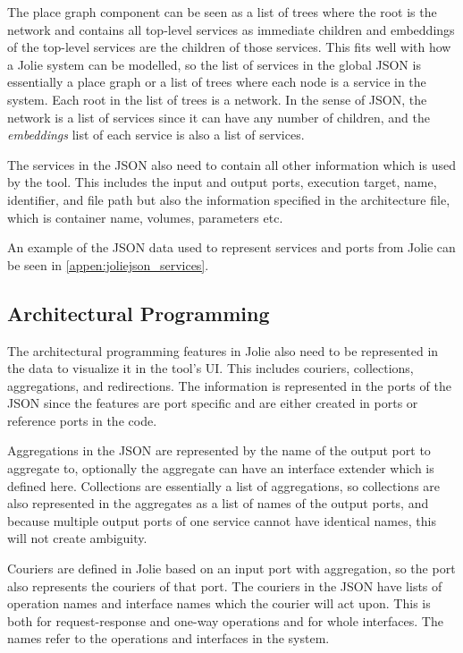The place graph component can be seen as a list of trees where the root is the network and contains all top-level services as immediate children and embeddings of the top-level services are the children of those services.
This fits well with how a Jolie system can be modelled, so the list of services in the global JSON is essentially a place graph or a list of trees where each node is a service in the system.
Each root in the list of trees is a network. In the sense of JSON, the network is a list of services since it can have any number of children, and the \emph{embeddings} list of each service is also a list of services.

The services in the JSON also need to contain all other information which is used by the tool.
This includes the input and output ports, execution target, name, identifier, and file path but also the information specified in the architecture file, which is container name, volumes, parameters etc.

An example of the JSON data used to represent services and ports from Jolie can be seen in \cref{appen:joliejson_services}.

\subsection{Architectural Programming}
The architectural programming features in Jolie also need to be represented in the data to visualize it in the tool's UI.
This includes couriers, collections, aggregations, and redirections. The information is represented in the ports of the JSON since the features are port specific and are either created in ports or reference ports in the code.

Aggregations in the JSON are represented by the name of the output port to aggregate to, optionally the aggregate can have an interface extender which is defined here.
Collections are essentially a list of aggregations, so collections are also represented in the aggregates as a list of names of the output ports, and because multiple output ports of one service cannot have identical names, this will not create ambiguity.

Couriers are defined in Jolie based on an input port with aggregation, so the port also represents the couriers of that port.
The couriers in the JSON have lists of operation names and interface names which the courier will act upon. This is both for request-response and one-way operations and for whole interfaces. The names refer to the operations and interfaces in the system.

